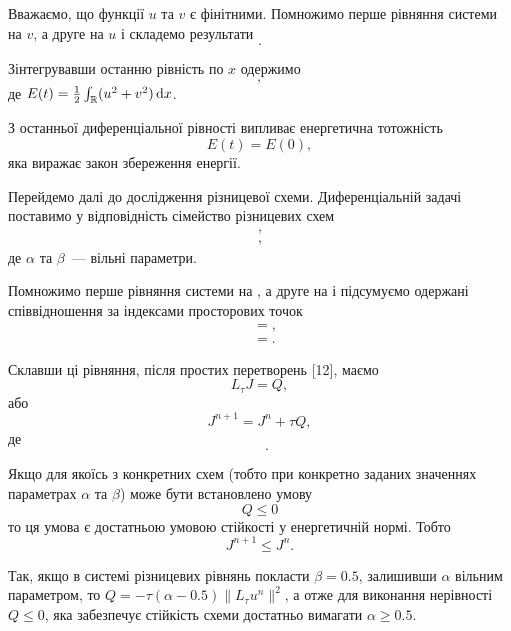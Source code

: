 Вважаємо, що функції $u$ та $v$ є фінітними. Помножимо перше рівняння системи на $v$, а друге на $u$ і складемо результати
\begin{equation*}
    .
\end{equation*}

Зінтегрувавши останню рівність по $x$ одержимо
\begin{equation*}
    ,
\end{equation*}
де $E(t) = \frac{1}{2} \int_{\mathbb{R}} (u^2 + v^2) \mathop{}\!\mathrm{d} x$. \medskip

З останньої диференціальної рівності випливає енергетична тотожність
\begin{equation*}
    E(t) = E(0),
\end{equation*}
яка виражає закон збереження енергії. \medskip

Перейдемо далі до дослідження різницевої схеми. Диференціальній задачі  поставимо у відповідність сімейство різницевих схем
\begin{gather*}
    , \\
    ,    
\end{gather*}
де $\alpha$ та $\beta$~--- вільні параметри. \medskip

Помножимо перше рівняння системи на  , а друге на   і підсумуємо одержані співвідношення за індексами просторових точок
\begin{align*}
    &= , \\
    &= .
\end{align*}

Склавши ці рівняння, після простих перетворень [12], маємо
\begin{equation*}
    L_\tau J = Q,
\end{equation*}
або
\begin{equation*}
    J^{n + 1} = J^n + \tau Q,
\end{equation*}
де
\begin{equation*}
    \quad .
\end{equation*}

Якщо для якоїсь з конкретних схем (тобто при конкретно заданих значеннях параметрах $\alpha$ та $\beta$) може бути встановлено умову
\begin{equation*}
    Q \le 0
\end{equation*}
то ця умова є достатньою умовою стійкості у енергетичній нормі. Тобто
\begin{equation*}
    J^{n+1} \le J^n.
\end{equation*}

Так, якщо в системі різницевих рівнянь покласти $\beta = 0.5$, залишивши $\alpha$ вільним параметром, то $Q = -\tau (\alpha - 0.5) \|L_\tau u^n\|^2$, а отже для виконання нерівності $Q \le 0$, яка забезпечує стійкість схеми достатньо вимагати $\alpha \ge 0.5$. \medskip

